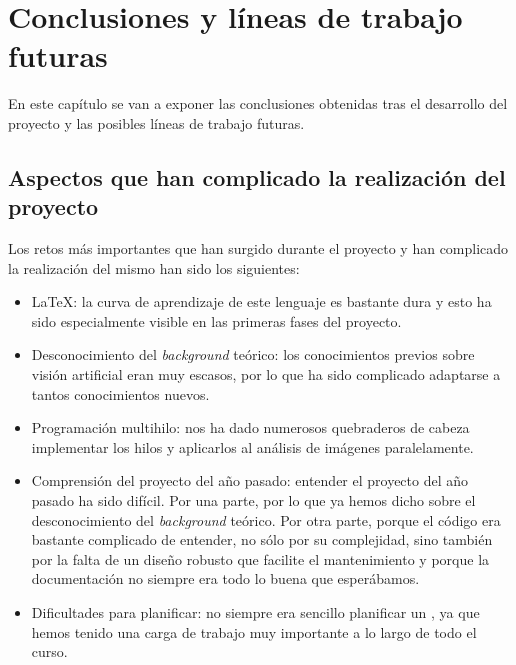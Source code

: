 \chapter{Conclusiones y líneas de trabajo futuras}

En este capítulo se van a exponer las conclusiones obtenidas tras el desarrollo del proyecto y las posibles líneas de trabajo futuras.


\section{Aspectos que han complicado la realización del proyecto}
Los retos más importantes que han surgido durante el proyecto y han complicado la realización del mismo han sido los siguientes:
\begin{itemize}
 \item \LaTeX{}: la curva de aprendizaje de este lenguaje es bastante dura y esto ha sido especialmente visible en las primeras fases del proyecto.
 \item Desconocimiento del \textit{background} teórico: los conocimientos previos sobre visión artificial eran muy escasos, por lo que ha sido complicado adaptarse a tantos conocimientos nuevos. 
\item Programación multihilo: nos ha dado numerosos quebraderos de cabeza implementar los hilos y aplicarlos al análisis de imágenes paralelamente.
\item Comprensión del proyecto del año pasado: entender el proyecto del año pasado ha sido difícil. Por una parte, por lo que ya hemos dicho sobre el desconocimiento del \textit{background} teórico. Por otra parte, porque el código era bastante complicado de entender, no sólo por su complejidad, sino también por la falta de un diseño robusto que facilite el mantenimiento y porque la documentación no siempre era todo lo buena que esperábamos.
\item Dificultades para planificar: no siempre era sencillo planificar un \sprint{}, ya que hemos tenido una carga de trabajo muy importante a lo largo de todo el curso.
 
\end{itemize}

\newpage

